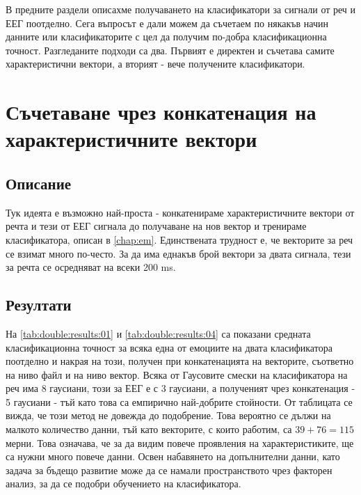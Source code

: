 \documentclass[main.tex]{subfiles}
\begin{document}
В предните раздели описахме получаването на класификатори за сигнали от реч и ЕЕГ поотделно. Сега въпросът е дали можем да съчетаем по някакъв начин данните или класификаторите с цел да получим по-добра класификационна точност. Разгледаните подходи са два. Първият е директен и съчетава самите характеристични вектори, а вторият - вече получените класификатори.

\section{Съчетаване чрез конкатенация на характеристичните вектори}
\subsection{Описание}
Тук идеята е възможно най-проста - конкатенираме характеристичните вектори от речта и тези от ЕЕГ сигнала до получаване на нов вектор и тренираме класификатора, описан в \autoref{chap:em}. Единствената трудност е, че векторите за реч се взимат много по-често. За да има еднакъв брой вектори за двата сигнала, тези за речта се осредняват на всеки 200 ms.
\subsection{Резултати}
На \autoref{tab:double:results:01} и \autoref{tab:double:results:04} са показани средната класификационна точност за всяка една от емоциите на двата класификатора поотделно и накрая на този, получен при конкатенацията на векторите, съответно на ниво файл и на ниво вектор. Всяка от Гаусовите смески на класификатора на реч има 8 гаусиани, този за ЕЕГ е с 3 гаусиани, а полученият чрез конкатенация - 5 гаусиани - тъй като това са емпирично най-добрите стойности. От таблицата се вижда, че този метод не довежда до подобрение. Това вероятно се дължи на малкото количество данни, тъй като векторите, с които работим, са $39 + 76 = 115$ мерни. Това означава, че за да видим повече проявления на характеристиките, ще са нужни много повече данни. Освен набавянето на допълнителни данни, като задача за бъдещо развитие може да се намали пространството чрез факторен анализ, за да се подобри обучението на класификатора.
\end{document}

